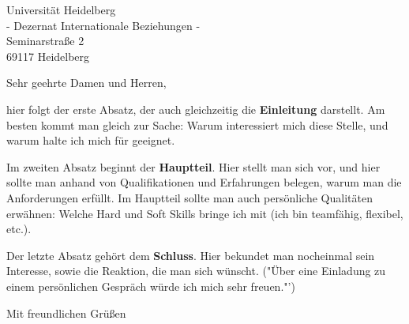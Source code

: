 \documentclass[fontsize=12pt]{scrlttr2}
\begin{document}
 \begin{letter}{ Universität Heidelberg \\- Dezernat Internationale Beziehungen -\\
		     Seminarstraße 2\\69117 Heidelberg} 		
 
\opening{Sehr geehrte Damen und Herren,}
 
hier folgt der erste Absatz, der auch gleichzeitig die 
\textbf{Einleitung} darstellt. Am besten kommt man gleich zur 
Sache: Warum interessiert mich diese Stelle, und warum halte
ich mich für geeignet.
 
Im zweiten Absatz beginnt der \textbf{ Hauptteil}. Hier stellt 
man sich vor, und hier sollte man anhand von Qualifikationen 
und Erfahrungen belegen, warum man die Anforderungen
erfüllt. Im Hauptteil sollte man auch persönliche Qualitäten 
erwähnen: Welche Hard und Soft Skills bringe ich mit (ich bin 
teamfähig, flexibel, etc.).
 
Der letzte Absatz gehört dem \textbf{Schluss}. Hier bekundet 
man nocheinmal sein Interesse, sowie die Reaktion, die man sich 
wünscht. ("Über eine Einladung zu einem persönlichen 
Gespräch würde ich mich sehr freuen."')
 
\closing{Mit freundlichen Grüßen}
 
 
 
 
\end{letter}
\end{document}
